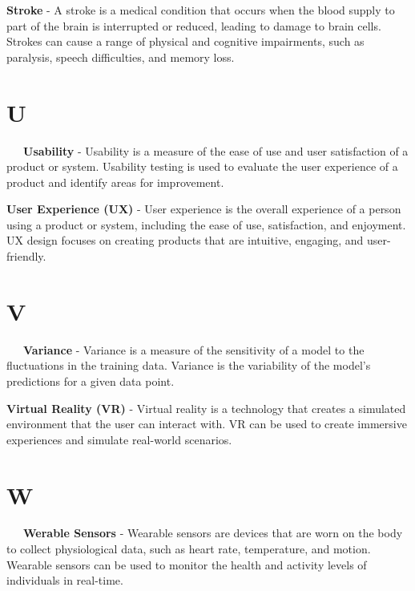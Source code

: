 \textbf{Stroke} - A stroke is a medical condition that occurs when the blood supply to part of the brain is interrupted or reduced, leading to damage to brain cells. Strokes can cause a range of physical and cognitive impairments, such as paralysis, speech difficulties, and memory loss.

\section*{U}

\-\ \-\ \-\ \textbf{Usability} - Usability is a measure of the ease of use and user satisfaction of a product or system. Usability testing is used to evaluate the user experience of a product and identify areas for improvement.

\textbf{User Experience (UX)} - User experience is the overall experience of a person using a product or system, including the ease of use, satisfaction, and enjoyment. UX design focuses on creating products that are intuitive, engaging, and user-friendly.

\section*{V}

\-\ \-\ \-\ \textbf{Variance} - Variance is a measure of the sensitivity of a model to the fluctuations in the training data. Variance is the variability of the model's predictions for a given data point.

\textbf{Virtual Reality (VR)} - Virtual reality is a technology that creates a simulated environment that the user can interact with. VR can be used to create immersive experiences and simulate real-world scenarios.

\section*{W}

\-\ \-\ \-\ \textbf{Werable Sensors} - Wearable sensors are devices that are worn on the body to collect physiological data, such as heart rate, temperature, and motion. Wearable sensors can be used to monitor the health and activity levels of individuals in real-time.
